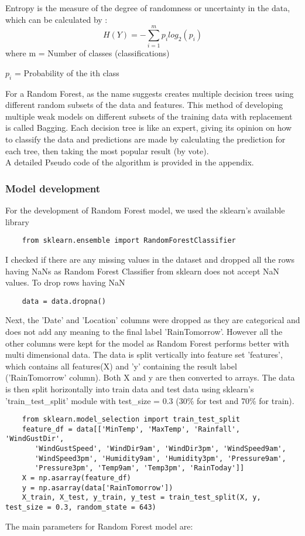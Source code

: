 \documentclass[10pt]{article}
\begin{document}
Entropy is the measure of the degree of randomness or uncertainty in the data, which can be calculated by :
\[H(Y) = -\sum_{i=1}^{m} p_i log_2(p_i) \]
where m = Number of classes (classifications)

\(p_i\) = Probability of the ith class

For a Random Forest, as the name suggests creates multiple decision trees using different random subsets of the data and features. This method of developing multiple weak models on different subsets of the training data with replacement is called Bagging.
Each decision tree is like an expert, giving its opinion on how to classify the data and predictions are made by calculating the prediction for each tree, then taking the most popular result (by vote).\\
A detailed Pseudo code of the algorithm is provided in the appendix.

\subsubsection{Model development}
For the development of Random Forest model, we used the sklearn's available library 
\begin{verbatim}
    from sklearn.ensemble import RandomForestClassifier
\end{verbatim}
I checked if there are any missing values in the dataset and dropped all the rows having NaNs as Random Forest Classifier from sklearn does not accept NaN values.
To drop rows having NaN
\begin{verbatim}
    data = data.dropna()
\end{verbatim} 
Next, the 'Date' and 'Location' columns were dropped as they are categorical and does not add any meaning to the final label 'RainTomorrow'. However all the other columns were kept for the model as Random Forest performs better with multi dimensional data.
The data is split vertically into feature set 'features', which contains all features(X) and 'y' containing the result label ('RainTomorrow' column). Both X and y are then converted to arrays.
The data is then split horizontally into train data and test data using sklearn's 'train\_test\_split' module with test\_size = 0.3 (30\% for test and 70\% for train).
\begin{verbatim}
    from sklearn.model_selection import train_test_split
    feature_df = data[['MinTemp', 'MaxTemp', 'Rainfall', 'WindGustDir',
       'WindGustSpeed', 'WindDir9am', 'WindDir3pm', 'WindSpeed9am',
       'WindSpeed3pm', 'Humidity9am', 'Humidity3pm', 'Pressure9am',
       'Pressure3pm', 'Temp9am', 'Temp3pm', 'RainToday']]
    X = np.asarray(feature_df)
    y = np.asarray(data['RainTomorrow'])
    X_train, X_test, y_train, y_test = train_test_split(X, y, test_size = 0.3, random_state = 643)
\end{verbatim} 
The main parameters for Random Forest model are:
\end{document}
